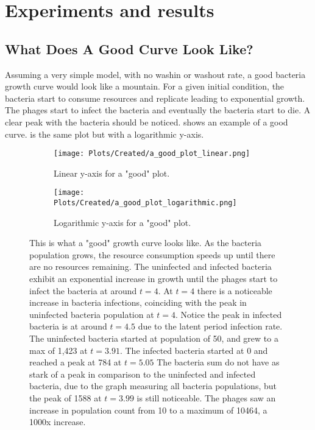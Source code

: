 \chapter{Experiments and results}
\label{AER}

\section{What Does A Good Curve Look Like?}
Assuming a very simple model, with no washin or washout rate, a good bacteria growth curve would look like a mountain. 
For a given initial condition, the bacteria start to consume resources and replicate leading to exponential growth. 
The phages start to infect the bacteria and eventually the bacteria start to die. 
A clear peak with the bacteria should be noticed. 
 shows an example of a good curve. 
 is the same plot but with a logarithmic y-axis. 

\begin{figure}[h!]
    \centering
    \begin{subfigure}{1\linewidth}
        \centering
        \texttt{[image: Plots/Created/a\_good\_plot\_linear.png]}
        \caption{
            Linear y-axis for a "good" plot. 
        }
        \label{fig:created:a_good_curve_linear}
    \end{subfigure}
    \hfill
    \begin{subfigure}{1\linewidth}
        \centering
        \texttt{[image: Plots/Created/a\_good\_plot\_logarithmic.png]}
        \caption{
            Logarithmic y-axis for a "good" plot. 
        }
        \label{fig:created:a_good_curve_logarithmic}
    \end{subfigure}
    \caption{
        This is what a "good" growth curve looks like. 
        As the bacteria population grows, the resource consumption speeds up until there are no resources remaining. 
        The uninfected and infected bacteria exhibit an exponential increase in growth until the phages start to infect the bacteria at around $t=4$. 
        At $t=4$ there is a noticeable increase in bacteria infections, coinciding with the peak in uninfected bacteria population at $t=4$. 
        Notice the peak in infected bacteria is at around $t=4.5$ due to the latent period infection rate. 
        The uninfected bacteria started at population of 50, and grew to a max of 1,423 at $t=3.91$. 
        The infected bacteria started at 0 and reached a peak at 784 at $t=5.05$
        The bacteria sum do not have as stark of a peak in comparison to the uninfected and infected bacteria, due to the graph measuring all bacteria populations, but the peak of 1588 at $t=3.99$ is still noticeable. 
        The phages saw an increase in population count from 10 to a maximum of 10464, a 1000x increase. 
    }
\end{figure}



